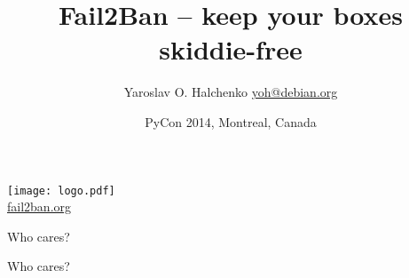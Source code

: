 \documentclass[]{beamer}
\title[Fail2Ban]{Fail2Ban -- keep your boxes skiddie-free}
\author[yoh AKA Yarik]{Yaroslav O. Halchenko
  \href{mailto: yoh@debian.org}{yoh@debian.org}}
\institute[Dartmouth, (Neuro)Debian]{\href{http://www.dartmouth.edu}{Dartmouth College},
\href{http://www.debian.org}{Debian Project}
}
\date[PyCon 2014]{PyCon 2014, Montreal, Canada}
\begin{document}
\frame{\titlepage}

\begin{frame}{}
\begin{center}
\texttt{[image: logo.pdf]}
\\
\href{http://fail2ban.org}{fail2ban.org}
\end{center}
\end{frame}

\begin{frame}{}
\begin{center}
\Large Who cares?
\end{center}
\end{frame}

\begin{frame}{Who cares?}
\begin{center}
\end{center}
\end{frame}
\end{document}
